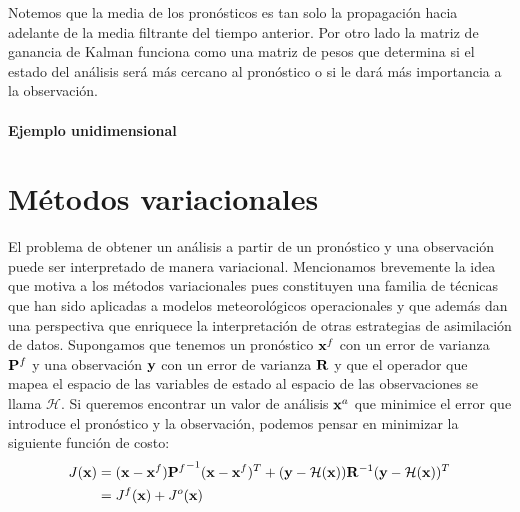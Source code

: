 Notemos que la media de los pronósticos es tan solo la propagación hacia adelante de la media filtrante del tiempo anterior. Por otro lado la matriz de ganancia de Kalman funciona como una matriz de pesos que determina si el estado del análisis será más cercano al pronóstico o si le dará más importancia a la observación. 

\paragraph{Ejemplo unidimensional}

\section{Métodos variacionales}

El problema de obtener un análisis a partir de un pronóstico y una observación puede ser interpretado de manera variacional. Mencionamos brevemente la idea que motiva a los métodos variacionales pues constituyen una familia de técnicas que han sido aplicadas a modelos meteorológicos operacionales y que además dan una perspectiva que enriquece la interpretación de otras estrategias de asimilación de datos. Supongamos que tenemos un pronóstico $\mathbf{x}^f$ con un error de varianza $\mathbf{P}^f$ y una observación $\mathbf{y}$ con un error de varianza $\mathbf{R}$ y que el operador que mapea el espacio de las variables de estado al espacio de las observaciones se llama $\mathcal{H}$. Si queremos encontrar un valor de análisis $\mathbf{x}^a$ que minimice el error que introduce el pronóstico y la observación, podemos pensar en minimizar la siguiente función de costo:
\begin{align}
    J(\mathbf{x}) &= (\mathbf{x} - \mathbf{x}^f) {\mathbf{P}^f}^{-1} (\mathbf{x} - \mathbf{x}^f)^T + (\mathbf{y} - \mathcal{H} (\mathbf{x})) \mathbf{R}^{-1} (\mathbf{y} - \mathcal{H} (\mathbf{x}))^T \label{eq:3dvar_cost} \\
    &= J^f(\mathbf{x}) + J^o(\mathbf{x})
\end{align}

